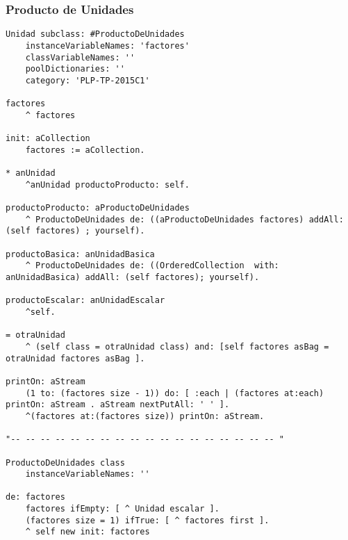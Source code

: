 \subsubsection{Producto de Unidades}
\begin{lstlisting}
Unidad subclass: #ProductoDeUnidades
	instanceVariableNames: 'factores'
	classVariableNames: ''
	poolDictionaries: ''
	category: 'PLP-TP-2015C1'

factores
	^ factores

init: aCollection 
	factores := aCollection.

* anUnidad 
	^anUnidad productoProducto: self.

productoProducto: aProductoDeUnidades 
	^ ProductoDeUnidades de: ((aProductoDeUnidades factores) addAll: (self factores) ; yourself).

productoBasica: anUnidadBasica 
	^ ProductoDeUnidades de: ((OrderedCollection  with: anUnidadBasica) addAll: (self factores); yourself).

productoEscalar: anUnidadEscalar 
	^self.

= otraUnidad
	^ (self class = otraUnidad class) and: [self factores asBag = otraUnidad factores asBag ].

printOn: aStream 
	(1 to: (factores size - 1)) do: [ :each | (factores at:each) printOn: aStream . aStream nextPutAll: ' ' ].
	^(factores at:(factores size)) printOn: aStream.

"-- -- -- -- -- -- -- -- -- -- -- -- -- -- -- -- -- -- "

ProductoDeUnidades class
	instanceVariableNames: ''

de: factores 
	factores ifEmpty: [ ^ Unidad escalar ]. 
	(factores size = 1) ifTrue: [ ^ factores first ].
	^ self new init: factores

\end{lstlisting}
\vspace{5mm}



